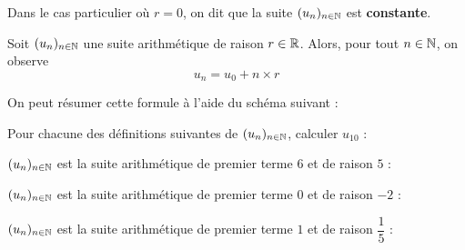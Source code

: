 \documentclass{poly}
\begin{document}
\begin{remark}
Dans le cas particulier où $r = 0$, on dit que la suite $(u_n)_{n \in \mathbb{N}}$ est \textbf{constante}.
\end{remark}
\newpage
\begin{proposition}
Soit $(u_n)_{n \in \mathbb{N}}$ une suite arithmétique de raison $r \in \mathbb{R}$. Alors, pour tout $n \in \mathbb{N}$, on observe
\begin{equation*}
u_n = u_0 + n \times r
\end{equation*}
\end{proposition}
\begin{remark}
On peut résumer cette formule à l'aide du schéma suivant :
\begin{center}
\end{center}
\end{remark}
\begin{example}
Pour chacune des définitions suivantes de $(u_n)_{n \in \mathbb{N}}$, calculer $u_{10}$ :
\begin{alphaquestions}
\item $(u_n)_{n \in \mathbb{N}}$ est la suite arithmétique de premier terme $6$ et de raison $5$ : 
\item $(u_n)_{n \in \mathbb{N}}$ est la suite arithmétique de premier terme $0$ et de raison $-2$ : 
\item $(u_n)_{n \in \mathbb{N}}$ est la suite arithmétique de premier terme $1$ et de raison $\dfrac{1}{5}$ : 
\end{alphaquestions}
\end{example}
\end{document}
